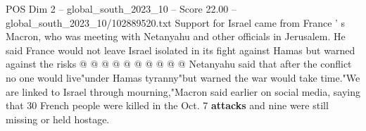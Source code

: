 \begin{textsample}{POS Dim 2 – global\_south\_2023\_10 – Score 22.00 – global\_south\_2023\_10/102889520.txt}
Support for Israel came from France ' s Macron, who was meeting with Netanyahu and other officials in Jerusalem.
He said France would not leave Israel isolated in its fight against Hamas but warned against the risks @ @ @ @ @ @ @ @ @ @ Netanyahu said that after the conflict no one would live"under Hamas tyranny"but warned the war would take time."We are linked to Israel through mourning,"Macron said earlier on social media, saying that 30 French people were killed in the Oct. 7 \textbf{attacks} and nine were still missing or held hostage.

\end{textsample}
